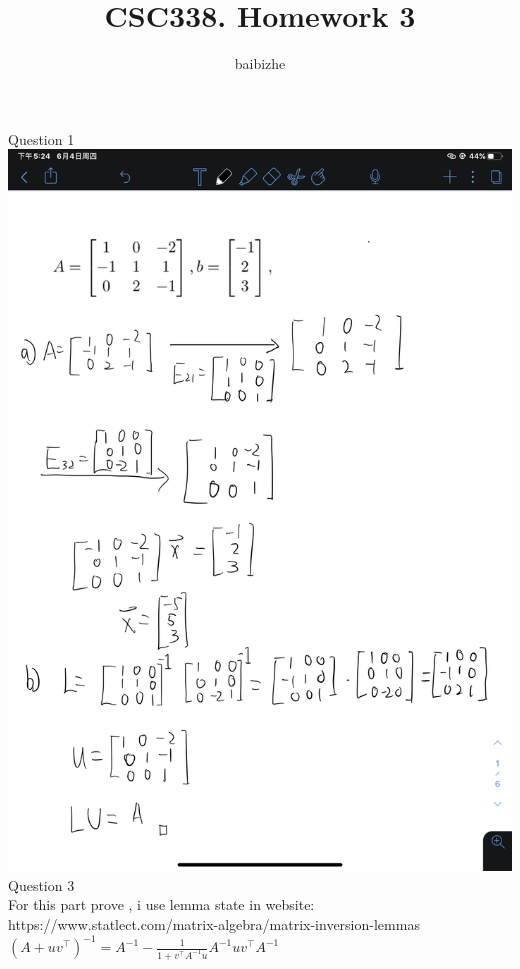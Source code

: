 \documentclass[18pt]{article}
\author{baibizhe}
\title{CSC338. Homework 3}
\begin{document}
\maketitle
\vspace{1.5cm}
\noindent
Question 1\\
    \includegraphics[scale=0.2]{1.PNG}\\
    Question 3\\
For this part prove , i use lemma state in website:\\ https://www.statlect.com/matrix-algebra/matrix-inversion-lemmas\\
$\left(A+u v^{\top}\right)^{-1}=A^{-1}-\frac{1}{1+v^{\top} A^{-1} u} A^{-1} u v^{\top} A^{-1}$\\
\end{document}
